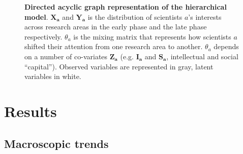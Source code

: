 \documentclass{article}
\begin{document}
\begin{figure}
    \centering
    \caption{\textbf{Directed acyclic graph representation of the hierarchical model}. $\bm{X_a}$ and $\bm{Y_a}$ is the distribution of scientists $a$'s interests across research areas in the early phase and the late phase respectively. $\theta_a$ is the mixing matrix that represents how scientists $a$ shifted their attention from one research area to another. $\theta_a$ depends on a number of co-variates $\bm{Z_a}$ (e.g. $\bm{I_a}$ and $\bm{S_a}$, intellectual and social ``capital''). Observed variables are represented in gray, latent variables in white.}
    \label{fig:model_structure}
\end{figure}

 \section{\label{sec:results}Results}

 \subsection{\label{sec:macro}Macroscopic trends}
\end{document}

